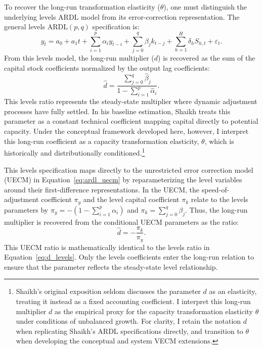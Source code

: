 To recover the long-run transformation elasticity ($\theta$), one must distinguish the underlying levels ARDL model from its error-correction representation. The general levels $\text{ARDL}(p, q)$ specification is:
\begin{equation}
y_t = a_0 + a_1 t + \sum_{i=1}^p \alpha_i y_{t-i} + \sum_{j=0}^q \beta_j k_{t-j} + \sum_{h=1}^H \delta_h S_{h,t} + \varepsilon_t .
\label{eq:ardl_levels}
\end{equation}
From this levels model, the long-run multiplier ($d$) is recovered as the sum of the capital stock coefficients normalized by the output lag coefficients:
\begin{equation}
\hat{d} = \frac{\sum_{j=0}^q \hat{\beta}_j}{1 - \sum_{i=1}^p \hat{\alpha}_i} .
\label{eq:d_levels}
\end{equation}
This levels ratio represents the steady-state multiplier where dynamic adjustment processes have fully settled. In his baseline estimation, Shaikh treats this parameter as a constant technical coefficient mapping capital directly to potential capacity. Under the conceptual framework developed here, however, I interpret this long-run coefficient as a capacity transformation elasticity, $\theta$, which is historically and distributionally conditioned.\footnote{Shaikh's original exposition \citep{Shaikh2016} seldom discusses the parameter $d$ as an elasticity, treating it instead as a fixed accounting coefficient. I interpret this long-run multiplier $d$ as the empirical proxy for the capacity transformation elasticity $\theta$ under conditions of unbalanced growth. For clarity, I retain the notation $d$ when replicating Shaikh's ARDL specifications directly, and transition to $\theta$ when developing the conceptual and system VECM extensions.}

This levels specification maps directly to the unrestricted error correction model (UECM) in Equation~\eqref{eq:ardl_uecm} by reparameterizing the level variables around their first-difference representations. In the UECM, the speed-of-adjustment coefficient $\pi_y$ and the level capital coefficient $\pi_k$ relate to the levels parameters by $\pi_y = -(1 - \sum_{i=1}^p \alpha_i)$ and $\pi_k = \sum_{j=0}^q \beta_j$. Thus, the long-run multiplier is recovered from the conditional UECM parameters as the ratio:
\begin{equation}
\hat{d} = -\frac{\pi_k}{\pi_y} .
\label{eq:d_recovery}
\end{equation}
This UECM ratio is mathematically identical to the levels ratio in Equation~\eqref{eq:d_levels}. Only the levels coefficients enter the long-run relation to ensure that the parameter reflects the steady-state level relationship.

